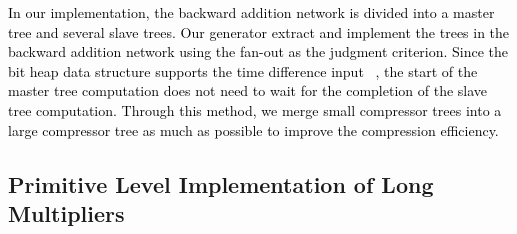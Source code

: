\documentclass[conference]{IEEEtran}
\begin{document}
\begin{figure}[!htb]    %
	\centering  %
	\subfigbottomskip=2pt  %
	\subfigcapskip=-5pt  %
	\caption{}
	\label{Figure6}
\end{figure}


\textcolor{black}{
In our implementation, the backward addition network is divided into a master tree and several slave trees. Our generator extract and implement the trees in the backward addition network using the fan-out as the judgment criterion. Since the bit heap data structure supports the time difference input ~\cite{Arithmetic_core_generation_using_bit_heaps}, the start of the master tree computation does not need to wait for the completion of the slave tree computation. Through this method, we merge small compressor trees into a large compressor tree as much as possible to improve the compression efficiency.
}

\subsection{Primitive Level Implementation of Long Multipliers}    %
\end{document}
